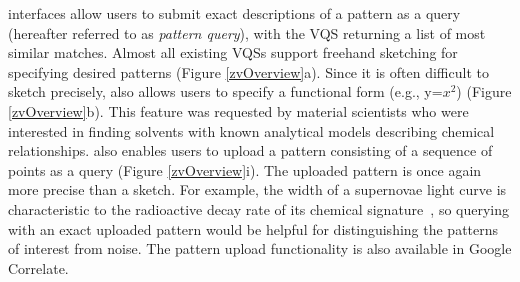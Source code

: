  interfaces 
allow users to submit exact descriptions 
of a pattern as a query 
(hereafter referred to as \textit{pattern query}), 
with the VQS returning a list of most similar matches. 
Almost all existing VQSs support freehand 
sketching for specifying desired patterns 
(Figure \ref{zvOverview}a). 
Since it is often difficult to sketch precisely, 
\zvpp also allows users to specify a functional 
form (e.g., y=$x^2$)  (Figure \ref{zvOverview}b). 
This feature was requested by material scientists 
who were interested in finding solvents 
with known analytical models describing chemical relationships. 
\zvpp also enables users to upload a pattern consisting of a sequence of points as a query (Figure \ref{zvOverview}i). 
The uploaded pattern is once again more precise than a sketch. 
For example, the width of a supernovae light curve 
is characteristic to the radioactive decay rate of its chemical signature~\cite{Nugent1997}, so querying with an exact uploaded pattern would be helpful for distinguishing the patterns of interest from noise. 
The pattern upload functionality is also available in Google Correlate.

